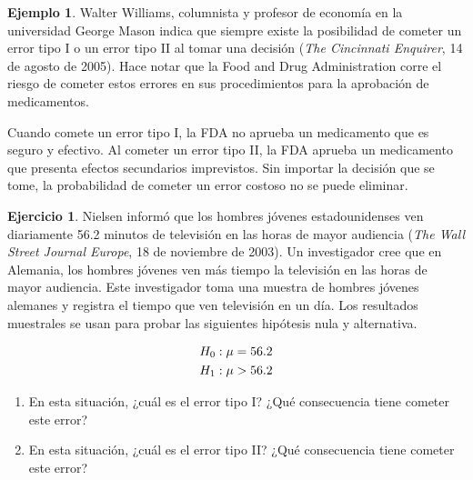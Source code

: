 \documentclass[
  11pt,
]{book}
\providecommand{\tightlist}{%
  \setlength{\itemsep}{0pt}\setlength{\parskip}{0pt}}
\theoremstyle{definition}
\theoremstyle{definition}
\newtheorem{example}{Ejemplo}[chapter]
\theoremstyle{definition}
\newtheorem{exercise}{Ejercicio}[chapter]
\theoremstyle{definition}
\theoremstyle{remark}
\begin{document}
\begin{example}
Walter Williams, columnista y profesor de economía en la universidad George Mason indica que siempre existe la posibilidad de cometer un error tipo I o un error tipo II al tomar una decisión (\emph{The Cincinnati Enquirer}, 14 de agosto de 2005). Hace notar que la Food and Drug Administration corre el riesgo de cometer estos errores en sus procedimientos para la aprobación de medicamentos.

Cuando comete un error tipo I, la FDA no aprueba un medicamento que es seguro y efectivo. Al cometer un error tipo II, la FDA aprueba un medicamento que presenta efectos secundarios imprevistos. Sin importar la decisión que se tome, la probabilidad de cometer un error costoso no se puede eliminar.
\end{example}

\begin{exercise}

Nielsen informó que los hombres jóvenes estadounidenses ven diariamente 56.2 minutos de televisión en las horas de mayor audiencia (\emph{The Wall Street Journal Europe}, 18 de noviembre de 2003). Un investigador cree que en Alemania, los hombres jóvenes ven más tiempo la televisión en las horas de mayor audiencia. Este investigador toma una muestra de hombres jóvenes alemanes y registra el tiempo que ven televisión en un día. Los resultados muestrales se usan para probar las siguientes hipótesis nula y alternativa.

\begin{equation}
\notag
\begin{split}
H_0&: \mu = 56.2\\
H_1&: \mu > 56.2\\
\end{split}
\end{equation}

\begin{enumerate}
\def\labelenumi{\alph{enumi}.}
\tightlist
\item
  En esta situación, ¿cuál es el error tipo I? ¿Qué consecuencia tiene cometer este error?
\item
  En esta situación, ¿cuál es el error tipo II? ¿Qué consecuencia tiene cometer este error?
\end{enumerate}

\end{exercise}
\end{document}
